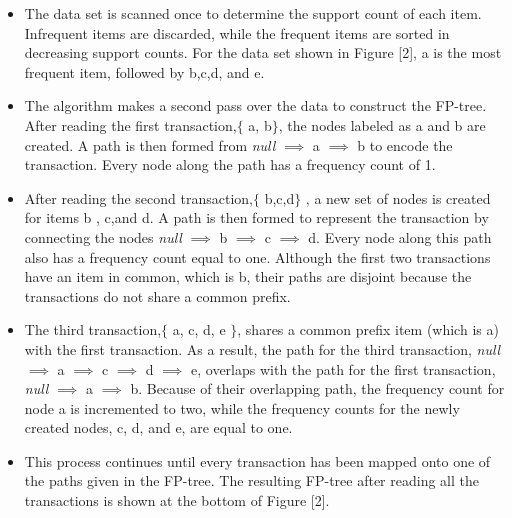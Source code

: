 \documentclass{article}\usepackage[]{graphicx}\usepackage[]{color}
\begin{document}
\begin{itemize}
\item The data set is scanned once to determine the support count of each item. Infrequent items are discarded, while the frequent items are sorted in decreasing support counts. For the data set shown in Figure [2], a is the most frequent item, followed by b,c,d, and e.
\item The algorithm makes a second pass over the data to construct the FP-tree. After reading the first transaction,$\{$ a, b$\}$, the nodes labeled as a and b are created. A path is then formed from \textit{null} $\implies$ a $\implies$ b to encode the transaction. Every node along the path has a frequency count of 1.
\item After reading the second transaction,$\{$ b,c,d$\}$ , a new set of nodes is created for items b ,
c,and d. A path is then formed to represent the transaction by connecting the nodes \textit{null} $\implies$ b $\implies$ c $\implies$ d. Every node along this path also has a frequency count equal to one. Although the first two transactions have an item in common, which is b, their paths are disjoint because the transactions do not share a common prefix.
\item The third transaction,$\{$ a, c, d, e $\}$, shares a common prefix item (which is a) with the first transaction. As a result, the path for the third transaction, \textit{null} $\implies$ a $\implies$ c $\implies$ d $\implies$ e, overlaps with the path for the first transaction, \textit{null} $\implies$ a $\implies$ b. Because of their overlapping path, the frequency count for node a is incremented to two, while the frequency counts for the newly created nodes, c, d, and e, are equal to one.
\item This process continues until every transaction has been mapped onto one of the paths given in the FP-tree. The resulting FP-tree after reading all the transactions is shown at the bottom of Figure [2].
\end{itemize}
\end{document}
